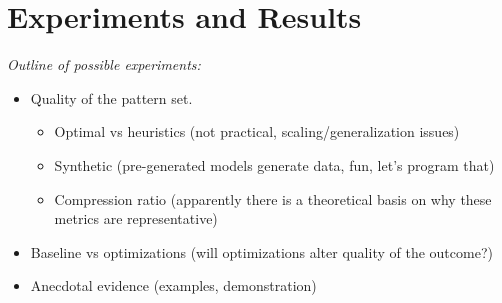 \documentclass{llncs}
\begin{document}
\section{Experiments and Results}

\emph{Outline of possible experiments:}
\begin{itemize}
\item Quality of the pattern set.
\begin{itemize}
\item Optimal vs heuristics (not practical, scaling/generalization issues)
\item Synthetic (pre-generated models generate data, fun, let's program that)
\item Compression ratio (apparently there is a theoretical basis on why these metrics are representative)
\end{itemize}
\item Baseline vs optimizations (will optimizations alter quality of the outcome?)
\item Anecdotal evidence (examples, demonstration)
\end{itemize}
\end{document}
